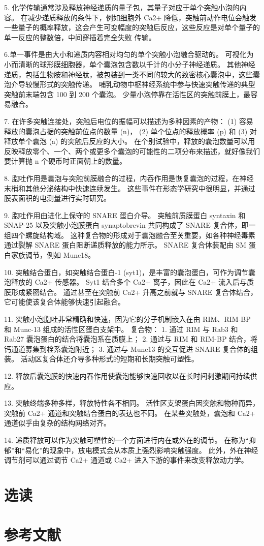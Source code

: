 5. 化学传输通常涉及释放神经递质的量子包，其量子对应于单个突触小泡的内容。 
在减少递质释放的条件下，例如细胞外 Ca2+ 降低，突触前动作电位会触发一些量子的概率释放，这会产生可变幅度的突触后反应，这些反应是对单个量子的单一反应的整数倍，中间穿插着完全失败 传输。 


6.单一事件是由大小和递质内容相对均匀的单个突触小泡融合驱动的。 
可视化为小而清晰的球形膜细胞器，单个囊泡包含数以千计的小分子神经递质。 
其他神经递质，包括生物胺和神经肽，被包装到一类不同的较大的致密核心囊泡中，这些囊泡介导较慢形式的突触传递。 
哺乳动物中枢神经系统中参与快速突触传递的典型突触前末端包含 100 到 200 个囊泡。 
少量小泡停靠在活性区的突触前膜上，最容易融合。


7. 在许多突触连接处，突触后电位的振幅可以描述为多种因素的产物：
(1) 容易释放的囊泡占据的突触前位点的数量 (n)，
(2) 单个位点的释放概率 (p) 和 
(3) 对释放单个囊泡 (a) 的突触后反应的大小。 
在个别试验中，释放的囊泡数量可以用反映释放零个、一个、两个或更多个囊泡的可能性的二项分布来描述，就好像我们要计算抛 n 个硬币时正面朝上的数量。 


8. 胞吐作用是囊泡与突触前膜融合的过程，内吞作用是恢复囊泡的过程，在神经末梢和其他分泌结构中快速连续发生。 
这些事件在形态学研究中很明显，并通过膜表面积的电测量进行实时研究。 


9. 胞吐作用由进化上保守的 SNARE 蛋白介导。 
突触前质膜蛋白 syntaxin 和 SNAP-25 以及突触小泡膜蛋白 synaptobrevin 共同构成了 SNARE 复合体，即一组四个螺旋结构域。 
这种复合物的形成对于囊泡融合至关重要，如各种神经毒素通过裂解 SNARE 蛋白阻断递质释放的能力所示。 
SNARE 复合体装配由 SM 蛋白家族调节，例如 Munc18。 


10. 突触结合蛋白，如突触结合蛋白-1 (syt1)，是丰富的囊泡蛋白，可作为调节囊泡释放的 Ca2+ 传感器。 
Syt1 结合多个 Ca2+ 离子，因此在 Ca2+ 流入后与质膜形成紧密结合。 
通过甚至在突触前 Ca2+ 升高之前就与 SNARE 复合体结合，它可能使该复合体能够快速引起融合。 


11. 突触小泡胞吐非常精确和快速，因为它的分子机制嵌入在由 RIM、RIM-BP 和 Munc-13 组成的活性区蛋白支架中。 
复合物： 1. 通过 RIM 与 Rab3 和 Rab27 囊泡蛋白的结合将囊泡系在质膜上； 2. 通过与 RIM 和 RIM-BP 结合，将钙通道募集到栓系囊泡附近； 3. 通过与 Munc13 的交互促进 SNARE 复合体的组装。 活动区复合体还介导多种形式的短期和长期突触可塑性。 


12. 释放后囊泡膜的快速内吞作用使囊泡能够快速回收以在长时间刺激期间持续供应。 


13. 突触终端多种多样，释放特性各不相同。 
活性区支架蛋白因突触和物种而异，突触前 Ca2+ 通道和突触结合蛋白的表达也不同。 
在某些突触处，囊泡和 Ca2+ 通道似乎由复杂的结构网络对齐。 


14. 递质释放可以作为突触可塑性的一个方面进行内在或外在的调节。 
在称为“抑郁”和“易化”的现象中，放电模式会从本质上强烈影响突触强度。 
此外，外在神经调节剂可以通过调节 Ca2+ 通道或 Ca2+ 进入下游的事件来改变释放动力学。


\section{选读}

\section{参考文献}

